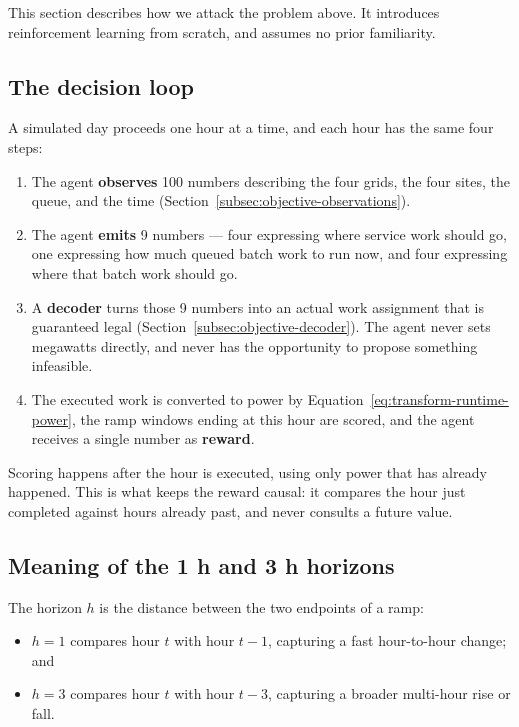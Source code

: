 ﻿\documentclass[12pt]{article}
\begin{document}
This section describes how we attack the problem above. It introduces
reinforcement learning from scratch, and assumes no prior familiarity.

\subsection{The decision loop}
\label{subsec:objective-hourly-decision}

A simulated day proceeds one hour at a time, and each hour has the same four
steps:

\begin{enumerate}
  \item The agent \textbf{observes} 100 numbers describing the four grids, the
        four sites, the queue, and the time
        (Section~\ref{subsec:objective-observations}).
  \item The agent \textbf{emits} 9 numbers --- four expressing where service
        work should go, one expressing how much queued batch work to run now,
        and four expressing where that batch work should go.
  \item A \textbf{decoder} turns those 9 numbers into an actual work
        assignment that is guaranteed legal
        (Section~\ref{subsec:objective-decoder}). The agent never sets megawatts
        directly, and never has the opportunity to propose something infeasible.
  \item The executed work is converted to power by
        Equation~\eqref{eq:transform-runtime-power}, the ramp windows ending at
        this hour are scored, and the agent receives a single number as
        \textbf{reward}.
\end{enumerate}

Scoring happens after the hour is executed, using only power that has already
happened. This is what keeps the reward causal: it compares the hour just
completed against hours already past, and never consults a future value.

\subsection{Meaning of the 1 h and 3 h horizons}
\label{subsec:objective-horizons}

The horizon \(h\) is the distance between the two endpoints of a ramp:
\begin{itemize}
  \item \(h=1\) compares hour \(t\) with hour \(t-1\), capturing a fast
        hour-to-hour change; and
  \item \(h=3\) compares hour \(t\) with hour \(t-3\), capturing a broader
        multi-hour rise or fall.
\end{itemize}
\end{document}
